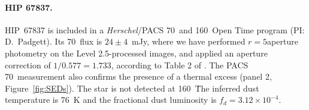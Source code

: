 \paragraph{HIP 67837.}
HIP~67837 is included in a \textit{Herschel}/PACS 70\micron\ and 160\micron\ Open Time program (PI: D.~Padgett).  Its 70\micron\ flux is $24\pm4$~mJy, where we have performed $r=5$\arcsec aperture photometry on the Level 2.5-processed images, and applied an aperture correction of $1/0.577=1.733$, according to Table 2 of \citet{Balog2013}. The PACS 70\micron\ measurement also confirms the presence of a thermal excess (panel 2, Figure~\ref{fig:SEDs}).  The star is not detected at 160~\micron\.  The inferred dust temperature is 76~K and the fractional dust luminosity is $f_d=3.12\times10^{-4}$.

